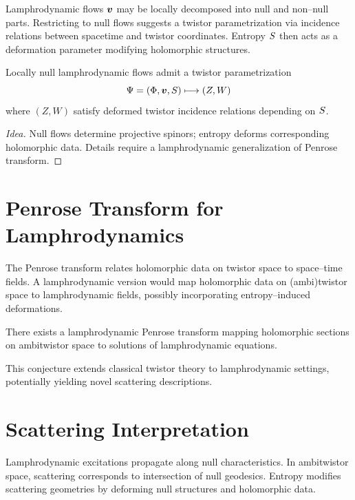 Lamphrodynamic flows $\bm{v}$ may be locally decomposed into null and
non--null parts. Restricting to null flows suggests a twistor
parametrization via incidence relations between spacetime and twistor
coordinates. Entropy $S$ then acts as a deformation parameter
modifying holomorphic structures.

\begin{proposition}[Heuristic]
Locally null lamphrodynamic flows admit a twistor parametrization
\[
  \Psi = (\Phi,\bm{v},S) \longmapsto (Z,W)
\]
where $(Z,W)$ satisfy deformed twistor incidence relations depending on
$S$.
\end{proposition}

\begin{proof}[Idea]
Null flows determine projective spinors; entropy deforms corresponding
holomorphic data. Details require a lamphrodynamic generalization of
Penrose transform.
\end{proof}


\section{Penrose Transform for Lamphrodynamics}

The Penrose transform relates holomorphic data on twistor space to
space--time fields. A lamphrodynamic version would map holomorphic data
on (ambi)twistor space to lamphrodynamic fields, possibly incorporating
entropy--induced deformations.

\begin{conjecture}
There exists a lamphrodynamic Penrose transform mapping holomorphic
sections on ambitwistor space to solutions of lamphrodynamic equations.
\end{conjecture}

\begin{remark}
This conjecture extends classical twistor theory to lamphrodynamic
settings, potentially yielding novel scattering descriptions.
\end{remark}


\section{Scattering Interpretation}

Lamphrodynamic excitations propagate along null characteristics. In
ambi\-twistor space, scattering corresponds to intersection of null
geodesics. Entropy modifies scattering geometries by deforming null
structures and holomorphic data.

